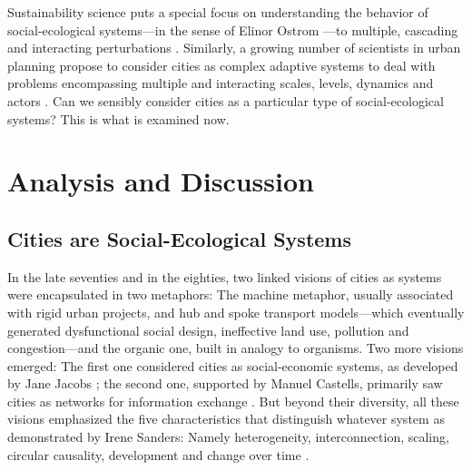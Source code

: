 \documentclass[10pt,a4paper]{article}
\begin{document}
\begin{multicols}{2}
Sustainability science puts a special focus on understanding the behavior of social-ecological systems---in the sense of Elinor Ostrom \citep{r61}---to multiple, cascading and interacting perturbations \citep{r62}. Similarly, a growing number of scientists in urban planning propose to consider cities as complex adaptive systems to deal with problems encompassing multiple and interacting scales, levels, dynamics and actors \citep{r63, r64, r65}. Can we sensibly consider cities as a particular type of social-ecological systems? This is what is examined now. 

\section{Analysis and Discussion}
\subsection{Cities are Social-Ecological Systems}
\noindent {}

In the late seventies and in the eighties, two linked visions of cities as systems were encapsulated in two metaphors: The machine metaphor, usually associated with rigid urban projects, and hub and spoke transport models---which eventually generated dysfunctional social design, ineffective land use, pollution and congestion---and the organic one, built in analogy to organisms. Two more visions emerged: The first one considered cities as social-economic systems, as developed by Jane Jacobs \citep{r79}; the second one, supported by Manuel Castells, primarily saw cities as networks for information exchange \citep{r80}. But beyond their diversity, all these visions emphasized the five characteristics that distinguish whatever system as demonstrated by Irene Sanders: Namely heterogeneity, interconnection, scaling, circular causality, development and change over time \citep{r81}.


\end{multicols}
\end{document}
